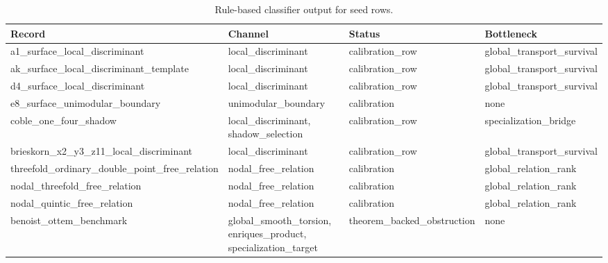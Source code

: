 \begin{table}[h]
\centering
\caption{Rule-based classifier output for seed rows.}
\label{tab:classifier-report}
\footnotesize
\begin{tabular}{|p{}|p{}|p{}|p{}|}
\hline
Record & Channel & Status & Bottleneck \\
\hline
a1\_\allowbreak{}surface\_\allowbreak{}local\_\allowbreak{}discriminant & local\_\allowbreak{}discriminant & calibration\_\allowbreak{}row & global\_\allowbreak{}transport\_\allowbreak{}survival \\
ak\_\allowbreak{}surface\_\allowbreak{}local\_\allowbreak{}discriminant\_\allowbreak{}template & local\_\allowbreak{}discriminant & calibration\_\allowbreak{}row & global\_\allowbreak{}transport\_\allowbreak{}survival \\
d4\_\allowbreak{}surface\_\allowbreak{}local\_\allowbreak{}discriminant & local\_\allowbreak{}discriminant & calibration\_\allowbreak{}row & global\_\allowbreak{}transport\_\allowbreak{}survival \\
e8\_\allowbreak{}surface\_\allowbreak{}unimodular\_\allowbreak{}boundary & unimodular\_\allowbreak{}boundary & calibration & none \\
coble\_\allowbreak{}one\_\allowbreak{}four\_\allowbreak{}shadow & local\_\allowbreak{}discriminant, shadow\_\allowbreak{}selection & calibration\_\allowbreak{}row & specialization\_\allowbreak{}bridge \\
brieskorn\_\allowbreak{}x2\_\allowbreak{}y3\_\allowbreak{}z11\_\allowbreak{}local\_\allowbreak{}discriminant & local\_\allowbreak{}discriminant & calibration\_\allowbreak{}row & global\_\allowbreak{}transport\_\allowbreak{}survival \\
threefold\_\allowbreak{}ordinary\_\allowbreak{}double\_\allowbreak{}point\_\allowbreak{}free\_\allowbreak{}relation & nodal\_\allowbreak{}free\_\allowbreak{}relation & calibration & global\_\allowbreak{}relation\_\allowbreak{}rank \\
nodal\_\allowbreak{}threefold\_\allowbreak{}free\_\allowbreak{}relation & nodal\_\allowbreak{}free\_\allowbreak{}relation & calibration & global\_\allowbreak{}relation\_\allowbreak{}rank \\
nodal\_\allowbreak{}quintic\_\allowbreak{}free\_\allowbreak{}relation & nodal\_\allowbreak{}free\_\allowbreak{}relation & calibration & global\_\allowbreak{}relation\_\allowbreak{}rank \\
benoist\_\allowbreak{}ottem\_\allowbreak{}benchmark & global\_\allowbreak{}smooth\_\allowbreak{}torsion, enriques\_\allowbreak{}product, specialization\_\allowbreak{}target & theorem\_\allowbreak{}backed\_\allowbreak{}obstruction & none \\

\end{tabular}
\end{table}
